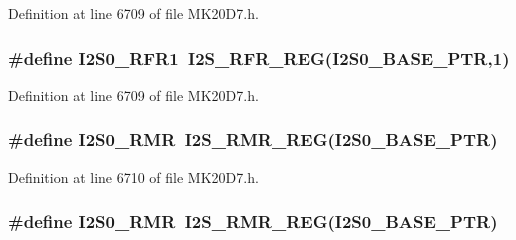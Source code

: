 Definition at line 6709 of file M\+K20\+D7.\+h.

\subsubsection[{\texorpdfstring{I2\+S0\+\_\+\+R\+F\+R1}{I2S0_RFR1}}]{\setlength{\rightskip}{0pt plus 5cm}\#define I2\+S0\+\_\+\+R\+F\+R1~{\bf I2\+S\+\_\+\+R\+F\+R\+\_\+\+R\+EG}({\bf I2\+S0\+\_\+\+B\+A\+S\+E\+\_\+\+P\+TR},1)}\hypertarget{group___i2_s___register___accessor___macros_gae1f6abd914de0f2c78acdc458367073a}{}\label{group___i2_s___register___accessor___macros_gae1f6abd914de0f2c78acdc458367073a}


Definition at line 6709 of file M\+K20\+D7.\+h.

\subsubsection[{\texorpdfstring{I2\+S0\+\_\+\+R\+MR}{I2S0_RMR}}]{\setlength{\rightskip}{0pt plus 5cm}\#define I2\+S0\+\_\+\+R\+MR~{\bf I2\+S\+\_\+\+R\+M\+R\+\_\+\+R\+EG}({\bf I2\+S0\+\_\+\+B\+A\+S\+E\+\_\+\+P\+TR})}\hypertarget{group___i2_s___register___accessor___macros_ga7caa1b854fa4c0e8b44c1a4e6e045698}{}\label{group___i2_s___register___accessor___macros_ga7caa1b854fa4c0e8b44c1a4e6e045698}


Definition at line 6710 of file M\+K20\+D7.\+h.

\subsubsection[{\texorpdfstring{I2\+S0\+\_\+\+R\+MR}{I2S0_RMR}}]{\setlength{\rightskip}{0pt plus 5cm}\#define I2\+S0\+\_\+\+R\+MR~{\bf I2\+S\+\_\+\+R\+M\+R\+\_\+\+R\+EG}({\bf I2\+S0\+\_\+\+B\+A\+S\+E\+\_\+\+P\+TR})}\hypertarget{group___i2_s___register___accessor___macros_ga7caa1b854fa4c0e8b44c1a4e6e045698}{}\label{group___i2_s___register___accessor___macros_ga7caa1b854fa4c0e8b44c1a4e6e045698}


